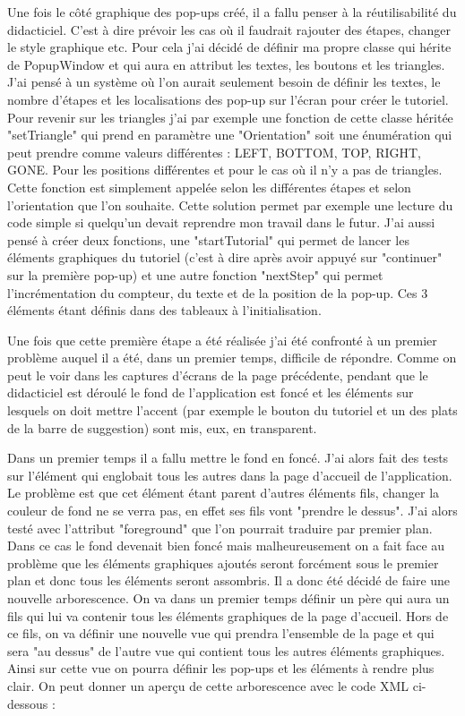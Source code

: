 Une fois le côté graphique des pop-ups créé, il a fallu penser à la réutilisabilité du didacticiel. C'est à dire prévoir les cas où il faudrait rajouter des étapes, changer le style graphique etc. Pour cela j'ai décidé de définir ma propre classe qui hérite de PopupWindow et qui aura en attribut les textes, les boutons et les triangles. J'ai pensé à un système où l'on aurait seulement besoin de définir les textes, le nombre d'étapes et les localisations des pop-up sur l'écran pour créer le tutoriel. Pour revenir sur les triangles j'ai par exemple une fonction de cette classe héritée "setTriangle" qui prend en paramètre une "Orientation" soit une énumération qui peut prendre comme valeurs différentes : LEFT, BOTTOM, TOP, RIGHT, GONE. Pour les positions différentes et pour le cas où il n'y a pas de triangles. Cette fonction est simplement appelée selon les différentes étapes et selon l'orientation que l'on souhaite. Cette solution permet par exemple une lecture du code simple si quelqu'un devait reprendre mon travail dans le futur. J'ai aussi pensé à créer deux fonctions, une "startTutorial" qui permet de lancer les éléments graphiques du tutoriel (c'est à dire après avoir appuyé sur "continuer" sur la première pop-up) et une autre fonction "nextStep" qui permet l'incrémentation du compteur, du texte et de la position de la pop-up. Ces 3 éléments étant définis dans des tableaux à l'initialisation.

Une fois que cette première étape a été réalisée j'ai été confronté à un premier problème auquel il a été, dans un premier temps, difficile de répondre. Comme on peut le voir dans les captures d'écrans de la page précédente, pendant que le didacticiel est déroulé le fond de l'application est foncé et les éléments sur lesquels on doit mettre l'accent (par exemple le bouton du tutoriel et un des plats de la barre de suggestion) sont mis, eux, en transparent.

Dans un premier temps il a fallu mettre le fond en foncé. J'ai alors fait des tests sur l'élément qui englobait tous les autres dans la page d'accueil de l'application. Le problème est que cet élément étant parent d'autres éléments fils, changer la couleur de fond ne se verra pas, en effet ses fils vont "prendre le dessus". J'ai alors testé avec l'attribut "foreground" que l'on pourrait traduire par premier plan. Dans ce cas le fond devenait bien foncé mais malheureusement on a fait face au problème que les éléments graphiques ajoutés seront forcément sous le premier plan et donc tous les éléments seront assombris. Il a donc été décidé de faire une nouvelle arborescence. On va dans un premier temps définir un père qui aura un fils qui lui va contenir tous les éléments graphiques de la page d'accueil. Hors de ce fils, on va définir une nouvelle vue qui prendra l'ensemble de la page et qui sera "au dessus" de l'autre vue qui contient tous les autres éléments graphiques. Ainsi sur cette vue on pourra définir les pop-ups et les éléments à rendre plus clair. On peut donner un aperçu de cette arborescence avec le code XML ci-dessous : 

